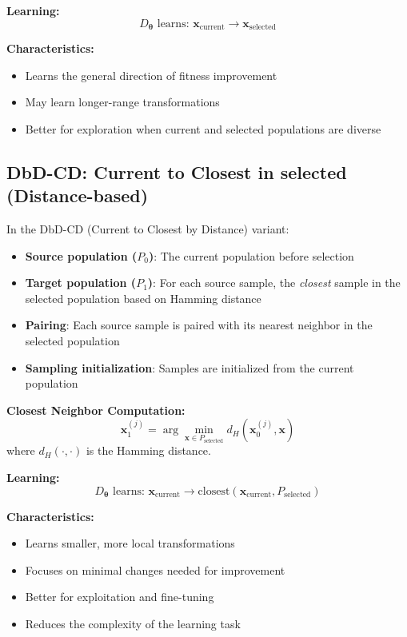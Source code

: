 \documentclass[11pt,a4paper]{article}
\newcommand{\vx}{\mathbf{x}}
\newcommand{\vtheta}{\boldsymbol{\theta}}
\begin{document}
\textbf{Learning:}
\begin{equation}
    D_\vtheta \text{ learns: } \vx_{\text{current}} \rightarrow \vx_{\text{selected}}
\end{equation}

\textbf{Characteristics:}
\begin{itemize}
    \item Learns the general direction of fitness improvement
    \item May learn longer-range transformations
    \item Better for exploration when current and selected populations are diverse
\end{itemize}

\subsection{DbD-CD: Current to Closest in selected (Distance-based)}

In the DbD-CD (Current to Closest by Distance) variant:

\begin{itemize}
    \item \textbf{Source population ($P_0$)}: The current population before selection
    \item \textbf{Target population ($P_1$)}: For each source sample, the \emph{closest} sample in the selected population based on Hamming distance
    \item \textbf{Pairing}: Each source sample is paired with its nearest neighbor in the selected population
    \item \textbf{Sampling initialization}: Samples are initialized from the current population
\end{itemize}

\textbf{Closest Neighbor Computation:}
\begin{equation}
    \vx_1^{(j)} = \arg\min_{\vx \in P_{\text{selected}}} d_H(\vx_0^{(j)}, \vx)
\end{equation}
where $d_H(\cdot, \cdot)$ is the Hamming distance.

\textbf{Learning:}
\begin{equation}
    D_\vtheta \text{ learns: } \vx_{\text{current}} \rightarrow \text{closest}(\vx_{\text{current}}, P_{\text{selected}})
\end{equation}

\textbf{Characteristics:}
\begin{itemize}
    \item Learns smaller, more local transformations
    \item Focuses on minimal changes needed for improvement
    \item Better for exploitation and fine-tuning
    \item Reduces the complexity of the learning task
\end{itemize}
\end{document}
